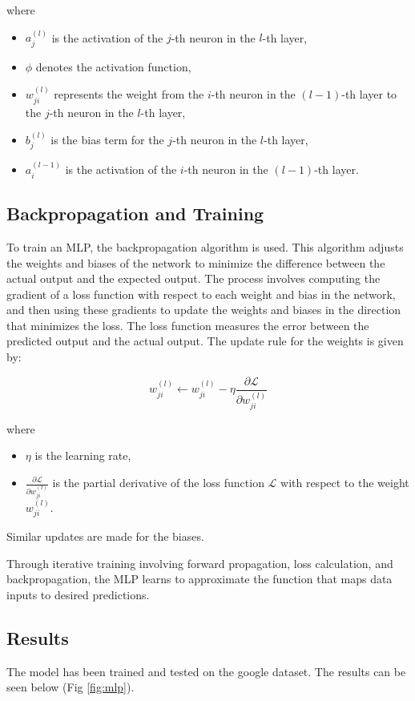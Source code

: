 where
\begin{itemize}
	\item $a^{(l)}_j$ is the activation of the $j$-th neuron in the $l$-th layer,
	\item $\phi$ denotes the activation function,
	\item $w^{(l)}_{ji}$ represents the weight from the $i$-th neuron in the $(l-1)$-th layer to the $j$-th neuron in the $l$-th layer,
	\item $b^{(l)}_j$ is the bias term for the $j$-th neuron in the $l$-th layer,
	\item $a^{(l-1)}_i$ is the activation of the $i$-th neuron in the $(l-1)$-th layer.
\end{itemize}

\subsection{Backpropagation and Training}

To train an MLP, the backpropagation algorithm is used.
This algorithm adjusts the weights and biases of the network to minimize the difference between the actual output and the expected output.
The process involves computing the gradient of a loss function with respect to each weight and bias in the network, and then using these gradients to update the weights and biases in the direction that minimizes the loss.
The loss function measures the error between the predicted output and the actual output. The update rule for the weights is given by:

\begin{equation}
	w^{(l)}_{ji} \leftarrow w^{(l)}_{ji} - \eta \frac{\partial \mathcal{L}}{\partial w^{(l)}_{ji}}
\end{equation}

where
\begin{itemize}
	\item $\eta$ is the learning rate,
	\item $\frac{\partial \mathcal{L}}{\partial w^{(l)}_{ji}}$ is the partial derivative of the loss function $\mathcal{L}$ with respect to the weight $w^{(l)}_{ji}$.
\end{itemize}
Similar updates are made for the biases.

Through iterative training involving forward propagation, loss calculation, and backpropagation, the MLP learns to approximate the function that maps data inputs to desired predictions.

\subsection{Results}
The model has been trained and tested on the google dataset.
The results can be seen below (Fig \ref{fig:mlp}).


